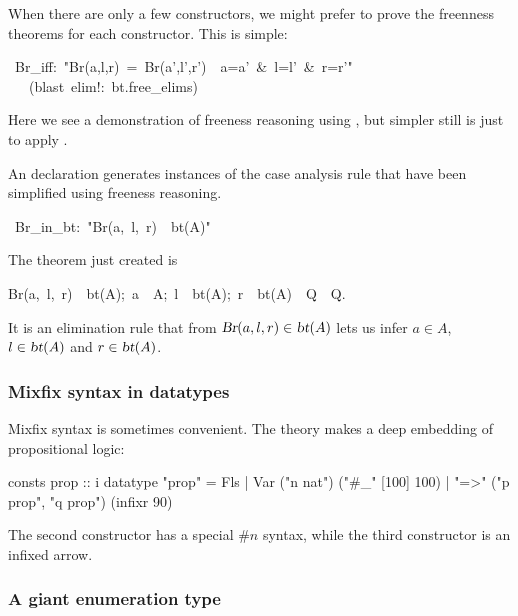 When there are only a few constructors, we might prefer to prove the freenness
theorems for each constructor.  This is simple:
\begin{isabelle}
\ Br\_iff:\ "Br(a,l,r)\ =\ Br(a',l',r')\ <->\ a=a'\ \&\ l=l'\ \&\ r=r'"\isanewline
\ \ \ (blast\ elim!:\ bt.free\_elims)
\end{isabelle}
Here we see a demonstration of freeness reasoning using
, but simpler still is just to apply .

An  declaration generates instances of the
case analysis rule that have been simplified  using freeness
reasoning. 
\begin{isabelle}
\ Br\_in\_bt:\ "Br(a,\ l,\ r)\ \isasymin \ bt(A)"
\end{isabelle}
The theorem just created is 
\begin{isabelle}
\isasymlbrakk Br(a,\ l,\ r)\ \isasymin \ bt(A);\ \isasymlbrakk a\ \isasymin \ A;\ l\ \isasymin \ bt(A);\ r\ \isasymin \ bt(A)\isasymrbrakk \ \isasymLongrightarrow \ Q\isasymrbrakk \ \isasymLongrightarrow \ Q.
\end{isabelle}
It is an elimination rule that from $\emph{\sl Br}(a,l,r)\in\emph{\sl bt}(A)$
lets us infer $a\in A$, $l\in\emph{\sl bt}(A)$ and
$r\in\emph{\sl bt}(A)$.


\subsubsection{Mixfix syntax in datatypes}

Mixfix syntax is sometimes convenient.  The theory  makes a
deep embedding of propositional logic:
\begin{ttbox}\isastyleminor
consts     prop :: i
datatype  "prop" = Fls
                 | Var ("n \isasymin nat")                ("#_" [100] 100)
                 | "=>" ("p \isasymin prop", "q \isasymin prop")   (infixr 90)
\end{ttbox}
The second constructor has a special $\#n$ syntax, while the third constructor
is an infixed arrow.


\subsubsection{A giant enumeration type}

